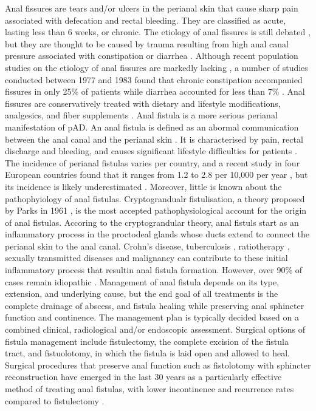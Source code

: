 Anal fissures are tears and/or ulcers in the perianal skin that cause sharp pain associated with defecation and rectal bleeding. They are classified as acute, lasting less than 6 weeks, or chronic. The etiology of anal fissures is still debated \cite{Beaty2016-yj}, but they are thought to be caused by trauma resulting from high anal canal pressure associated with constipation or diarrhea \cite{Mapel2014-wp}. Although recent population studies on the etiology of anal fissures are markedly lacking \cite{Mapel2014-wp}, a number of studies conducted between 1977 and 1983 found that chronic constipation accompanied fissures in only 25\% of patients while diarrhea accounted for less than 7\% \cite{Keighley2018-iy,McDonald1983-cs,Lock1977-go}. Anal fissures are conservatively treated with dietary and lifestyle modifications, analgesics, and fiber supplements \cite{nice_analfiss}. Anal fistula is a more serious perianal manifestation of pAD. An anal fistula is defined as an abormal communication between the anal canal and the perianal skin \cite{Sneider2013-qd}. It is characterised by pain, rectal discharge and bleeding, and causes significant lifestyle difficulties for patients \cite{Mei2019-ds}. The incidence of perianal fistulas varies per country, and a recent study in four European countries found that it ranges from 1.2 to 2.8 per 10,000 per year \cite{Zanotti2007-mb}, but its incidence is likely underestimated \cite{Eberspacher2022-sp}. Moreover, little is known about the pathophyiology of anal fistulas. Cryptograndualr fistulisation, a theory proposed by Parks in 1961 \cite{Parks1961-pe,Wlodarczyk2021-kh}, is the most accepted pathophysiological account for the origin of anal fistulas. Accoring to the cryptograndular theory, anal fistuls start as an inflammatory process in the proctodeal glands whose ducts extend to connect the perianal skin to the anal canal. Crohn's disease, tuberculosis \cite{Dudukgian2011-is}, ratiotherapy \cite{Johnston2003-jr}, sexually transmitted diseases \cite{Assi2014-at} and malignancy can contribute to these initial inflammatory process that resultin  anal fistula formation. However, over 90\% of cases remain idiopathic \cite{Simpson2012-gi}. Management of anal fistula depends on its type, extension, and underlying cause, but the end goal of all treatments is the complete drainage of abscess, and fistula healing while preserving anal sphincter function and continence. The management plan is typically decided based on a combined clinical, radiological and/or endoscopic assessment. Surgical options of fistula management include fistulectomy, the complete excision of the fistula tract, and fistuolotomy, in which the fistula is laid open and allowed to heal. Surgical procedures that preserve anal function such as fistolotomy with sphincter reconstruction have emerged in the last 30 years as a particularly effective method of treating anal fistulas, with lower incontinence and recurrence rates compared to fistulectomy \cite{Arroyo2012-qa,Jain2012-or}. \\

